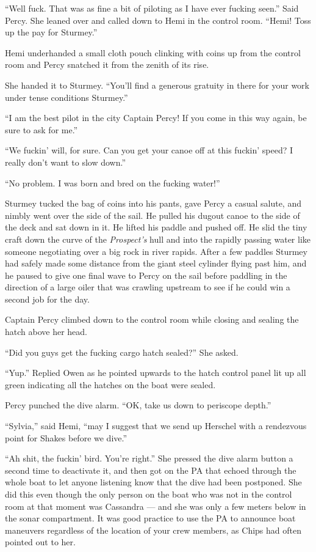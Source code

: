 \documentclass[
]{scrbook}
\begin{document}
``Well fuck. That was as fine a bit of piloting as I have ever fucking
seen.'' Said Percy. She leaned over and called down to Hemi in the
control room. ``Hemi! Toss up the pay for Sturmey.''

Hemi underhanded a small cloth pouch clinking with coins up from the
control room and Percy snatched it from the zenith of its rise.

She handed it to Sturmey. ``You'll find a generous gratuity in there for
your work under tense conditions Sturmey.''

``I am the best pilot in the city Captain Percy! If you come in this way
again, be sure to ask for me.''

``We fuckin' will, for sure. Can you get your canoe off at this fuckin'
speed? I really don't want to slow down.''

``No problem. I was born and bred on the fucking water!''

Sturmey tucked the bag of coins into his pants, gave Percy a casual
salute, and nimbly went over the side of the sail. He pulled his dugout
canoe to the side of the deck and sat down in it. He lifted his paddle
and pushed off. He slid the tiny craft down the curve of the
\emph{Prospect's} hull and into the rapidly passing water like someone
negotiating over a big rock in river rapids. After a few paddles Sturmey
had safely made some distance from the giant steel cylinder flying past
him, and he paused to give one final wave to Percy on the sail before
paddling in the direction of a large oiler that was crawling upstream to
see if he could win a second job for the day.

Captain Percy climbed down to the control room while closing and sealing
the hatch above her head.

``Did you guys get the fucking cargo hatch sealed?'' She asked.

``Yup.'' Replied Owen as he pointed upwards to the hatch control panel
lit up all green indicating all the hatches on the boat were sealed.

Percy punched the dive alarm. ``OK, take us down to periscope depth.''

``Sylvia,'' said Hemi, ``may I suggest that we send up Herschel with a
rendezvous point for Shakes before we dive.''

``Ah shit, the fuckin' bird. You're right.'' She pressed the dive alarm
button a second time to deactivate it, and then got on the PA that
echoed through the whole boat to let anyone listening know that the dive
had been postponed. She did this even though the only person on the boat
who was not in the control room at that moment was Cassandra --- and she
was only a few meters below in the sonar compartment. It was good
practice to use the PA to announce boat maneuvers regardless of the
location of your crew members, as Chips had often pointed out to her.
\end{document}
